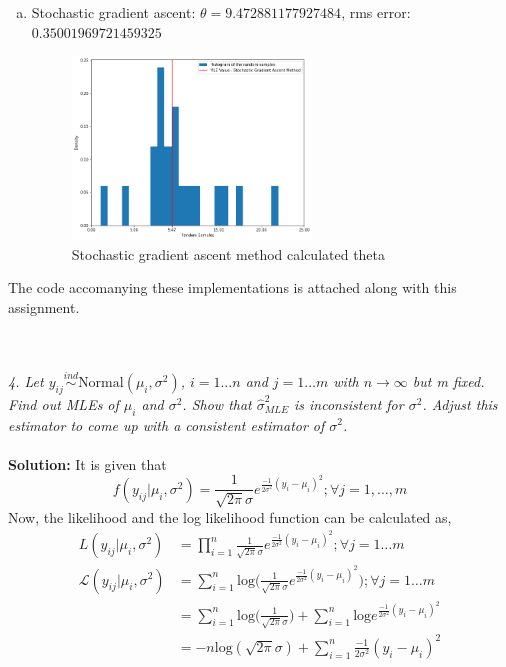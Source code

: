 \documentclass[11pt]{article}
\begin{document}
{\begin{enumerate}[a.]
\begin{figure}[H]
    \caption{Newton-Raphson method calculated theta}
  \end{figure}
  \item Stochastic gradient ascent: $\theta = 9.472881177927484$, rms error: $0.35001969721459325$
  \begin{figure}[H]
    \centering
    \includegraphics[width = 0.6\textwidth]{q3stocgrad.png}
    \caption{Stochastic gradient ascent method calculated theta}
  \end{figure}
\end{enumerate}
The code accomanying these implementations is attached along with this assignment.} \\ \\
\noindent \emph{4. Let $y_{ij} \overset{ind}{\sim} \text{Normal}(\mu_{i}, \sigma^{2})$, $i = 1 \dots n$ and $j = 1 \dots m$ with $n \rightarrow \infty$ but m fixed. Find out MLEs of $\mu_{i}$ and  $\sigma^{2}$. Show that $\hat{\sigma}_{MLE}^{2}$ is inconsistent for $\sigma^{2}$. Adjust this estimator to come up with a consistent estimator of $\sigma^{2}$.}\\ \\
\textbf{Solution:} It is given that
\begin{equation}
  \nonumber
  f(y_{ij} | \mu_{i}, \sigma^{2}) = \frac{1}{\sqrt{2\pi}\sigma}e^{\frac{-1}{2\sigma^{2}} (y_{i} - \mu_{i})^{2}}; \forall j = 1, \dots, m
\end{equation}
Now, the likelihood and the log likelihood function can be calculated as,
\begin{equation}
  \nonumber
  \begin{aligned}
    L(y_{ij} | \mu_{i}, \sigma^{2}) & = \prod_{i = 1}^{n} \frac{1}{\sqrt{2\pi}\sigma}e^{\frac{-1}{2\sigma^{2}} (y_{i} - \mu_{i})^{2}}; \forall j = 1 \dots m\\
    \mathcal{L}(y_{ij} | \mu_{i}, \sigma^{2}) & = \sum_{i = 1}^{n} \text{log}\bigg(\frac{1}{\sqrt{2\pi}\sigma}e^{\frac{-1}{2\sigma^{2}} (y_{i} - \mu_{i})^{2}}\bigg); \forall j = 1 \dots m\\
    & = \sum_{i = 1}^{n} \text{log}\bigg(\frac{1}{\sqrt{2 \pi} \sigma}\bigg) + \sum_{i = 1}^{n} \text{log} e^{\frac{-1}{2 \sigma^{2}} (y_{i} - \mu_{i})^{2}}\\
    & = -n\text{log}(\sqrt{2 \pi} \sigma) + \sum_{i = 1}^{n} \frac{-1}{2 \sigma^{2}}(y_{i} - \mu_{i})^{2}\\
  \end{aligned}
\end{equation}
\end{document}
